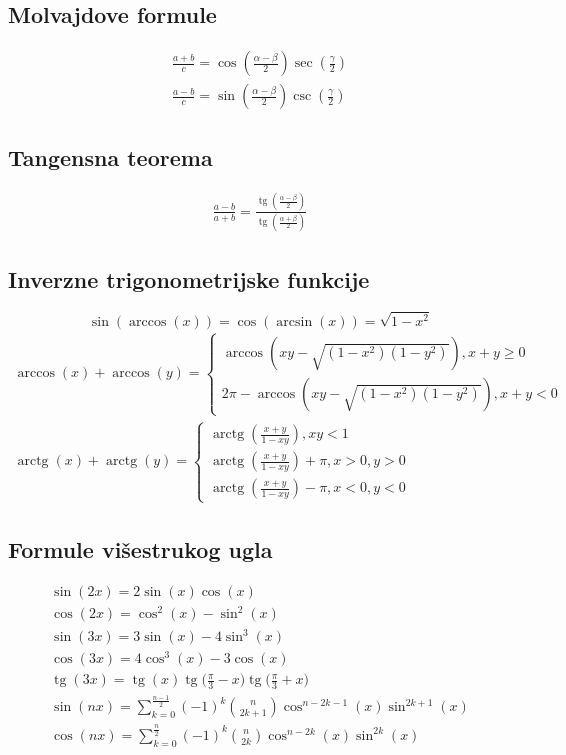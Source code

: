 \documentclass[a4paper,12pt,twoside]{report}
\numberwithin{algorithm}{section}
\renewcommand{\tan}{\operatorname{tg}}
\renewcommand{\arctan}{\operatorname{arctg}}
\begin{document}
\subsection{Molvajdove formule}
\[
\begin{aligned}
    \frac{a + b}{c} = \cos\left(\frac{\alpha - \beta}{2}\right) \sec\left(\frac{\gamma}{2}\right)\\
    \frac{a - b}{c} = \sin\left(\frac{\alpha - \beta}{2}\right) \csc\left(\frac{\gamma}{2}\right)
\end{aligned}
\]

\subsection{Tangensna teorema}
\[
\begin{aligned}
    \frac{a - b}{a + b} = \frac{\tan\left(\frac{\alpha - \beta}{2}\right)}{\tan\left(\frac{\alpha + \beta}{2}\right)}
\end{aligned}
\]


\subsection{Inverzne trigonometrijske funkcije}
\[
    \sin(\arccos(x)) = \cos(\arcsin(x))=\sqrt{1-x^2}
\]
\[
\begin{aligned}
\arccos(x) + \arccos(y) =
\begin{cases}
    \arccos\left(xy - \sqrt{(1-x^2)(1-y^2)}\right), x + y \geq 0\\
    2\pi - \arccos\left(xy - \sqrt{(1-x^2)(1-y^2)}\right), x + y < 0
\end{cases}\\
    \arctan(x) + \arctan(y) =
\begin{cases}
    \arctan\left(\frac{x+y}{1-xy}\right), xy < 1\\
    \arctan\left(\frac{x+y}{1-xy}\right) + \pi, x > 0, y > 0\\
    \arctan\left(\frac{x+y}{1-xy}\right) - \pi, x < 0, y < 0
\end{cases}
\end{aligned}
\]


\subsection{Formule višestrukog ugla}
\[
\begin{aligned}
    \sin(2x) = 2\sin(x)\cos(x)\\
    \cos(2x) = \cos^2(x) - \sin^2(x)\\
    \sin(3x) = 3\sin(x) - 4\sin^3(x)\\
    \cos(3x) = 4\cos^3(x) - 3\cos(x)\\
    \tan(3x)=\tan(x)\tan\bigg(\frac{\pi}{3}-x\bigg)\tan\bigg(\frac{\pi}{3}+x\bigg)\\
    \sin(nx) = \sum_{k = 0}^{\frac{n-1}{2}} (-1)^{k}\binom{n}{2k + 1} \cos^{n-2k-1}(x)\sin^{2k+1}(x)\\
    \cos(nx) = \sum_{k = 0}^{\frac{n}{2}} (-1)^{k}\binom{n}{2k} \cos^{n-2k}(x)\sin^{2k}(x)\\
\end{aligned}
\]
\end{document}
